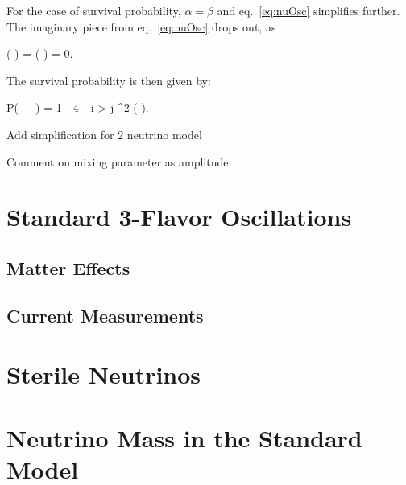 For the case of survival probability, $\alpha = \beta$ and eq.~\ref{eq:nuOsc} simplifies further. The imaginary piece from eq.~\ref{eq:nuOsc} drops out, as

\beq
\Im (     ) = \Im (   ) = 0.
\label{eq:survIm}
\eeq

\n The survival probability is then given by:

\beq
P(\nu_\alpha \rightarrow \nu_\alpha) = 1 - 4 \sum_{i > j}   \sin^2 \left(  \right).
\label{eq:nuSurv}
\eeq

Add simplification for 2 neutrino model

Comment on mixing parameter as amplitude

\section{Standard 3-Flavor Oscillations}
\label{sec:Theory3}

\subsection{Matter Effects}
\label{sec:TheoryMatter}

\subsection{Current Measurements}
\label{sec:BestMeasures}

\section{Sterile Neutrinos}
\label{sec:Theory3+1}

\section{Neutrino Mass in the Standard Model}
